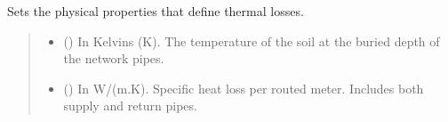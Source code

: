 \documentclass[letterpaper,10pt,english]{sphinxmanual}
\begin{document}
\begin{fulllineitems}
\begin{fulllineitems}
\label{\detokenize{generated/tamos.network.HREThermalNetwork:tamos.network.HREThermalNetwork.set_soil_properties}}
\pysigstartsignatures
{}
\pysigstopsignatures
\sphinxAtStartPar
Sets the physical properties that define thermal losses.
\begin{quote}\begin{description}
\begin{itemize}
\item {} 
\sphinxAtStartPar
{} (\sphinxstyleliteralemphasis{\sphinxupquote{, }}) \textendash{} In Kelvins (K).
The temperature of the soil at the buried depth of the network pipes.

\item {} 
\sphinxAtStartPar
{} (\sphinxstyleliteralemphasis{\sphinxupquote{, }}) \textendash{} In W/(m.K).
Specific heat loss per routed meter. Includes both supply  and return pipes.


\end{itemize}
\end{description}
\end{quote}
\end{fulllineitems}
\end{fulllineitems}
\end{document}
